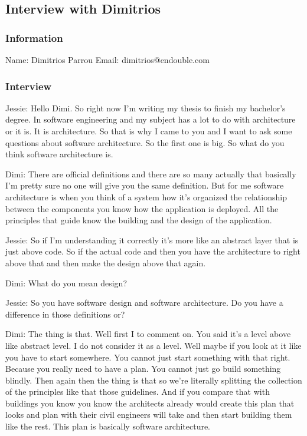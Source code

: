 \subsection{Interview with Dimitrios}

\subsubsection*{Information}
Name: Dimitrios Parrou
Email: dimitrios@endouble.com

\subsubsection*{Interview}

Jessie: Hello Dimi. So right now I'm writing my thesis to finish my bachelor's degree. In software engineering and my subject has a lot to do with architecture or it is. It is architecture. So that is why I came to you and I want to ask some questions about software architecture. So the first one is big. So what do you think software architecture is.

Dimi: There are official definitions and there are so many actually that basically I'm pretty sure no one will give you the same definition. But for me software architecture is when you think of a system how it's organized the relationship between the components you know how the application is deployed. All the principles that guide know the building and the design of the application.

Jessie: So if I'm understanding it correctly it's more like an abstract layer that is just above code. So if the actual code and then you have the architecture to right above that and then make the design above that again.

Dimi: What do you mean design?

Jessie: So you have software design and software architecture. Do you have a difference in those definitions or?

Dimi: The thing is that. Well first I to comment on. You said it's a level above like abstract level. I do not consider it as a level. Well maybe if you look at it like you have to start somewhere. You cannot just start something with that right. Because you really need to have a plan. You cannot just go build something blindly. Then again then the thing is that so we're literally splitting the collection of the principles like that those guidelines. And if you compare that with buildings you know you know the architects already would create this plan that looks and plan with their civil engineers will take and then start building them like the rest. This plan is basically software architecture.

